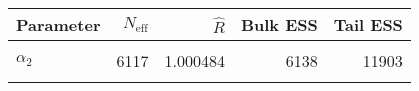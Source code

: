 \begin{table}[!h]
\centering
\begin{tabular}{>{\raggedright\arraybackslash}p{2cm}rrrr}
\toprule
Parameter & $N_{\text{eff}}$ & $\widehat{R}$ & Bulk ESS & Tail ESS\\
\midrule
\cellcolor{gray!6}{$\alpha_{0}$} & \cellcolor{gray!6}{5442} & \cellcolor{gray!6}{1.000411} & \cellcolor{gray!6}{5471} & \cellcolor{gray!6}{9997}\\
$\alpha_{2}$ & 6117 & 1.000484 & 6138 & 11903\\
\cellcolor{gray!6}{$\rho$} & \cellcolor{gray!6}{4737} & \cellcolor{gray!6}{1.000526} & \cellcolor{gray!6}{4767} & \cellcolor{gray!6}{4389}\\
\bottomrule
\end{tabular}
\end{table}
